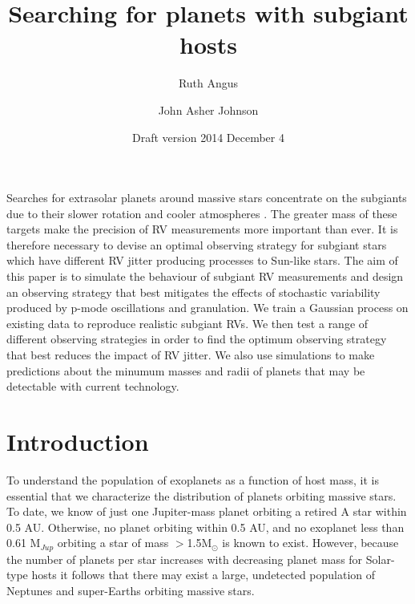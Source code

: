 \documentclass[useAMS, usenatbib]{aastex}
\title{Searching for planets with subgiant hosts}
\author{Ruth Angus}
\affil{Department of Physics, University of Oxford, UK}
\author{John Asher Johnson}
\affil{Harvard-Smithsonian Center for Astrophysics, Cambridge,
MA, USA}
\begin{document}
\date{Draft version 2014 December 4}
\maketitle


Searches for extrasolar planets around massive stars concentrate on
the subgiants due to their slower rotation and cooler atmospheres
\citep{Johnson2014}.
The greater mass of these targets make the precision of RV measurements more
important than ever.
It is therefore necessary to devise an optimal observing strategy for subgiant
stars which have different RV jitter producing processes to Sun-like stars.
The aim of this paper is to simulate the behaviour of subgiant RV
measurements and design an observing strategy that best mitigates the effects
of stochastic variability produced by p-mode oscillations and granulation.
We train a Gaussian process on existing data to reproduce realistic
subgiant RVs.
We then test a range of different observing strategies in order
to find the optimum observing strategy that best reduces the impact of
RV jitter.
We also use simulations to make predictions about the minumum masses and radii
of planets that may be detectable with current technology.


\section{Introduction}
\label{intro}

To understand the population of exoplanets as a function of host mass, it is
essential that we characterize the distribution of planets orbiting massive
stars.
To date, we know of just one Jupiter-mass planet orbiting a retired A star
within 0.5 AU.
Otherwise, no planet orbiting within 0.5 AU, and no exoplanet less than 0.61
M$_{Jup}$ orbiting a star of mass $>$1.5M$_{\odot}$ is known to exist.
However, because the number of planets per star increases with decreasing
planet mass for Solar-type hosts it follows that there may exist a large,
undetected population of Neptunes and super-Earths orbiting massive stars.

\end{document}
